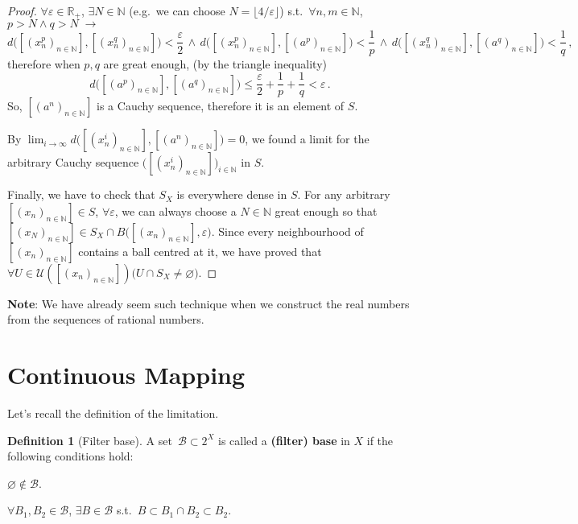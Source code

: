 \documentclass[openany]{book}
\theoremstyle{plain}
\theoremstyle{definition}
\newtheorem{definition}{Definition}[section] %
\begin{document}
\begin{proof}
	$\forall \varepsilon \in \mathbb R_+$, $\exists N \in \mathbb N$ 
		(e.g.\ we can choose $N = \lfloor 4/\varepsilon\rfloor$) 
	s.t.\ $\forall n, m \in \mathbb N$, $p > N \wedge q > N \;\to$
	\begin{equation*}
		d\big([(x^p_n)_{n \in \mathbb N}], [(x^q_n)_{n \in \mathbb N}]\big) < \frac \varepsilon 2
		\,\wedge\,
		d\big([(x^p_n)_{n \in \mathbb N}], [(a^p)_{n \in \mathbb N}]\big) < \frac 1 p
		\,\wedge\,
		d\big([(x^q_n)_{n \in \mathbb N}], [(a^q)_{n \in \mathbb N}]\big) < \frac 1 q
		\,,
	\end{equation*}
	therefore when $p, q$ are great enough, (by the triangle inequality)
	\begin{equation*}
		d\big([(a^p)_{n \in \mathbb N}], [(a^q)_{n \in \mathbb N}]\big) 
		\leq \frac \varepsilon 2 + \frac 1 p + \frac 1 q 
		< \varepsilon\,.
	\end{equation*}
	So, $[(a^n)_{n \in \mathbb N}]$ is a Cauchy sequence, therefore it is an element of $S$. 
	
	By $\lim_{i \to \infty} d\big([(x^i_n)_{n \in \mathbb N}], [(a^n)_{n \in \mathbb N}]\big) = 0$, we found a limit for the arbitrary Cauchy sequence $\big([(x^i_n)_{n \in \mathbb N}]\big)_{i \in \mathbb N}$ in $S$.

	Finally, we have to check that $S_X$ is everywhere dense in $S$. For any arbitrary $[(x_n)_{n \in \mathbb N}] \in S$, $\forall \varepsilon$, we can always choose a $N \in \mathbb N$ great enough so that $[(x_N)_{n \in \mathbb N}] \in S_X \cap B\big([(x_n)_{n \in \mathbb N}], \varepsilon\big)$. 
	Since every neighbourhood of $[(x_n)_{n \in \mathbb N}]$ contains a ball centred at it, we have proved that $\forall U \in \mathscr U([(x_n)_{n \in \mathbb N}]) \big( U \cap S_X \neq \varnothing \big)$.
\end{proof}

\textbf{Note}: We have already seem such technique when we construct the real numbers from the sequences of rational numbers.

\section{Continuous Mapping}
Let's recall the definition of the limitation.

\begin{definition}[Filter base]\label{definition: filter base}
	A set~$\mathscr{B} \subset 2^X$ is called a \textbf{(filter) base} in $X$ if the following conditions hold:
	\begin{conditionlist}[label=\alph*)]
		\item $\varnothing \notin \mathscr{B}$.
		\item $\forall B_1, B_2 \in \mathscr{B}$, $\exists B \in \mathscr{B}$ s.t.\ $B \subset B_1 \cap B_2 \subset B_2$. 
	\end{conditionlist}
\end{definition}
\end{document}
